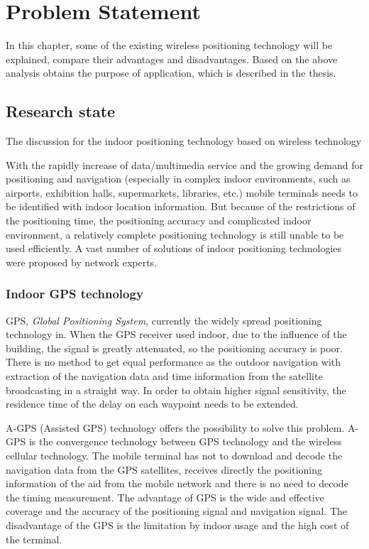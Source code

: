 \newpage
\chapter{Problem Statement}

In this chapter, some of the existing wireless positioning technology will be explained, compare their advantages and disadvantages. Based on the above analysis obtains the purpose of application, which is described in the thesis.

\section{Research state}

The discussion for the indoor positioning technology based on wireless technology

With the rapidly increase of data/multimedia service and the growing demand for positioning and navigation (especially in complex indoor environments, such as airports, exhibition halls, supermarkets, libraries, etc.) mobile terminals needs to be identified with indoor location information\cite{DavidSchwab2004}. But because of the restrictions of the positioning time, the positioning accuracy and complicated indoor environment, a relatively complete positioning technology is still unable to be used efficiently. A vast number of solutions of indoor positioning technologies were proposed by network experts.


\subsection{Indoor GPS technology}

GPS, \textit{Global Positioning System}, currently the widely spread positioning technology in\cite{JochenSchiller2008}. When the GPS receiver used indoor, due to the influence of the building, the signal is greatly attenuated, so the positioning accuracy is poor. There is no method to get equal performance as the outdoor navigation with extraction of the navigation data and time information from the satellite broadcasting in a straight way. In order to obtain higher signal sensitivity, the residence time of the delay on each waypoint needs to be extended.   

A-GPS (Assisted GPS) technology offers the possibility to solve this problem. A-GPS is the convergence technology between GPS technology and the wireless cellular technology. The mobile terminal has not to download and decode the navigation data from the GPS satellites, receives directly the positioning information of the aid from the mobile network and there is no need to decode the timing measurement.
The advantage of GPS is the wide and effective coverage and the accuracy of the positioning signal and navigation signal. The disadvantage of the GPS is the limitation by indoor usage and the high cost of the terminal.  


